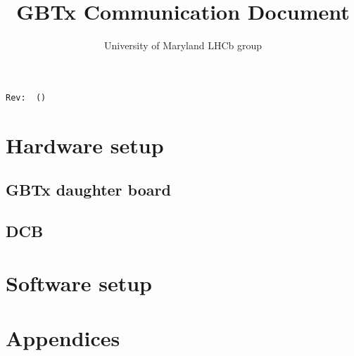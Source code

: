 \documentclass[11pt,letterpaper]{refart}
\title{GBTx Communication Document}
\author{University of Maryland LHCb group}
\begin{document}
\maketitle
\hfill\small{\texttt{Rev:~\gitRel~(\gitAbbrevHash)}}
\tableofcontents
\clearpage

\section{Hardware setup}
\subsection{GBTx daughter board}







\subsection{DCB}


\section{Software setup}





\newpage \appendix
\section*{Appendices}
\renewcommand{\thesubsection}{\Alph{subsection}}




\end{document}
